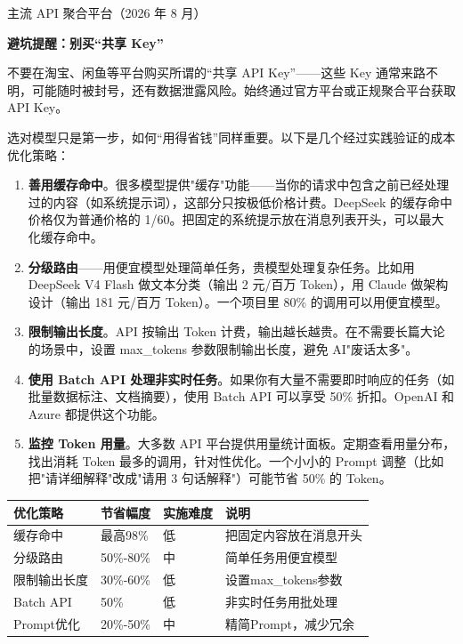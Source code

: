 \begin{center}\small\color{gray}主流 API 聚合平台（2026 年 8 月）\end{center}

\textbf{避坑提醒：别买“共享 Key”}\par

不要在淘宝、闲鱼等平台购买所谓的“共享 API Key”——这些 Key 通常来路不明，可能随时被封号，还有数据泄露风险。始终通过官方平台或正规聚合平台获取 API Key。


选对模型只是第一步，如何“用得省钱”同样重要。以下是几个经过实践验证的成本优化策略：

\begin{enumerate}
  \item \textbf{善用缓存命中}。很多模型提供"缓存"功能——当你的请求中包含之前已经处理过的内容（如系统提示词），这部分只按极低价格计费。DeepSeek 的缓存命中价格仅为普通价格的 1/60。把固定的系统提示放在消息列表开头，可以最大化缓存命中。
  \item \textbf{分级路由}——用便宜模型处理简单任务，贵模型处理复杂任务。比如用 DeepSeek V4 Flash 做文本分类（输出 2 元/百万 Token），用 Claude 做架构设计（输出 181 元/百万 Token）。一个项目里 80\% 的调用可以用便宜模型。
  \item \textbf{限制输出长度}。API 按输出 Token 计费，输出越长越贵。在不需要长篇大论的场景中，设置 max\_tokens 参数限制输出长度，避免 AI"废话太多"。
  \item \textbf{使用 Batch API 处理非实时任务}。如果你有大量不需要即时响应的任务（如批量数据标注、文档摘要），使用 Batch API 可以享受 50\% 折扣。OpenAI 和 Azure 都提供这个功能。
  \item \textbf{监控 Token 用量}。大多数 API 平台提供用量统计面板。定期查看用量分布，找出消耗 Token 最多的调用，针对性优化。一个小小的 Prompt 调整（比如把"请详细解释"改成"请用 3 句话解释"）可能节省 50\% 的 Token。
\end{enumerate}

\begin{center}
\begin{tabularx}{\linewidth}{|X|X|X|X|}
\hline
\textbf{优化策略} & \textbf{节省幅度} & \textbf{实施难度} & \textbf{说明} \tabularnewline
\hline
缓存命中 & 最高98\% & 低 & 把固定内容放在消息开头 \tabularnewline
分级路由 & 50\%-80\% & 中 & 简单任务用便宜模型 \tabularnewline
限制输出长度 & 30\%-60\% & 低 & 设置max\_tokens参数 \tabularnewline
Batch API & 50\% & 低 & 非实时任务用批处理 \tabularnewline
Prompt优化 & 20\%-50\% & 中 & 精简Prompt，减少冗余 \tabularnewline
\hline
\end{tabularx}
\end{center}

